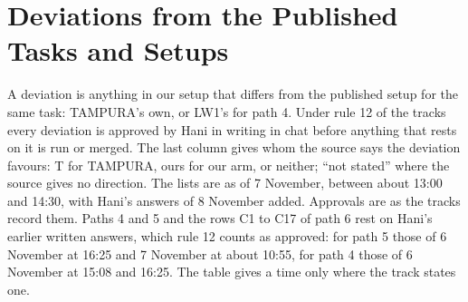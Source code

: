 
\chapter{Deviations from the Published Tasks and Setups}
\label{ch:appendix-deviations}

A deviation is anything in our setup that differs from the published setup for the
same task: TAMPURA's own, or LW1's for path 4. Under rule 12 of the tracks every deviation is approved by Hani in
writing in chat before anything that rests on it is run or merged. The last column
gives whom the source says the deviation favours: T for TAMPURA, ours for our arm,
or neither; ``not stated'' where the source gives no direction. The lists are as of
7 November, between about 13:00 and 14:30, with Hani's answers of 8 November added.
Approvals are as the tracks record them.
Paths 4 and 5 and the rows C1 to C17 of path 6 rest on Hani's earlier written answers,
which rule 12 counts as approved: for path 5 those of 6 November at 16:25 and 7
November at about 10:55, for path 4 those of 6 November at 15:08 and 16:25. The table
gives a time only where the track states one.

